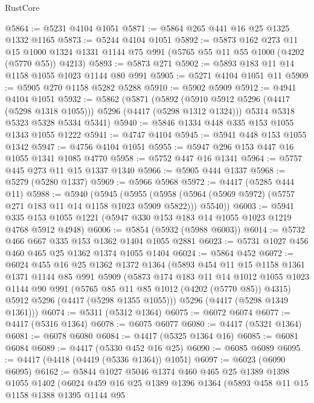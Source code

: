 \begin{lexlean}{RustCore}
\begin{coremodule}
@5864 := @5231 @4104 @1051
@5871 := @5864 @265 @441 @16 @25 @1325 @1332 @1165
@5873 := @5244 @4104 @1051
@5892 := @5873
    @162
    @273
    @11
    @15
    @1000
    @1324
    @1331
    @1144
    @75
    @991
    (@5765 @55 @11 @55 @1000 (@4202 (@5770 @55)) @4213)
@5893 := @5873 @271
@5902 := @5893 @183 @11 @14 @1158 @1055 @1023 @1144 @80 @991
@5905 := @5271 @4104 @1051 @11
@5909 := @5905 @270 @1158 @5282 @5288
@5910 := @5902 @5909
@5912 := @4941 @4104 @1051
@5932 := @5862
    (@5871
      (@5892 (@5910 @5912 @5296 (@4417 (@5298 @1318 @1055))) @5296 (@4417 (@5298 @1312 @1324)))
      @5314
      @5318
      @5323
      @5328
      @5334
      @5341)
@5940 := @5846 @1334 @448 @335 @153 @1055 @1343 @1055 @1222
@5941 := @4747 @4104
@5945 := @5941 @448 @153 @1055 @1342
@5947 := @4756 @4104 @1051
@5955 := @5947 @296 @153 @447 @16 @1055 @1341 @1085 @4770
@5958 := @5752 @447 @16 @1341
@5964 := @5757 @445 @273 @11 @15 @1337 @1340
@5966 := @5905 @444 @1337
@5968 := @5279 (@5280 @1337)
@5969 := @5966 @5968
@5972 := @4417 (@5285 @444 @11)
@5988 := @5940
    (@5945
      (@5955 (@5958 (@5964 (@5969 @5972) (@5757 @271 @183 @11 @14 @1158 @1023 @5909 @5822))) @5540))
@6003 := @5941 @335 @153 @1055 @1221 (@5947 @330 @153 @183 @14 @1055 @1023 @1219 @4768 @5912 @4948)
@6006 := @5854 (@5932 (@5988 @6003))
@6014 := @5732 @466 @667 @335 @153 @1362 @1404 @1055 @2881
@6023 := @5731 @1027 @456 @460 @465 @25 @1362 @1374 @1055 @1404
@6024 := @5864 @452
@6072 := @6024
    @455
    @16
    @25
    @1362
    @1372
    @1364
    (@5893
      @454
      @11
      @15
      @1158
      @1361
      @1371
      @1144
      @85
      @991
      @5909
      (@5873
        @174
        @183
        @11
        @14
        @1012
        @1055
        @1023
        @1144
        @90
        @991
        (@5765 @85 @11 @85 @1012 (@4202 (@5770 @85)) @4315)
        @5912
        @5296
        (@4417 (@5298 @1355 @1055)))
      @5296
      (@4417 (@5298 @1349 @1361)))
@6074 := @5311 (@5312 @1364)
@6075 := @6072 @6074
@6077 := @4417 (@5316 @1364)
@6078 := @6075 @6077
@6080 := @4417 (@5321 @1364)
@6081 := @6078 @6080
@6084 := @4417 (@5325 @1364 @16)
@6085 := @6081 @6084
@6089 := @4417 (@5330 @452 @16 @25)
@6090 := @6085 @6089
@6095 := @4417 (@4418 (@4419 (@5336 @1364)) @1051)
@6097 := @6023 (@6090 @6095)
@6162 := @5844
    @1027
    @5046
    @1374
    @460
    @465
    @25
    @1389
    @1398
    @1055
    @1402
    (@6024
      @459
      @16
      @25
      @1389
      @1396
      @1364
      (@5893
        @458
        @11
        @15
        @1158
        @1388
        @1395
        @1144
        @95

\end{coremodule}
\end{lexlean}
